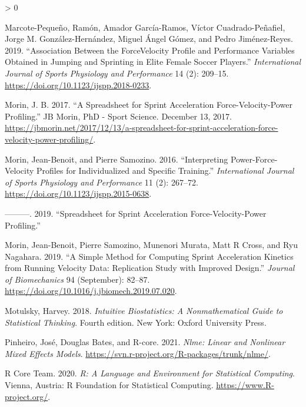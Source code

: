 \documentclass[fleqn,10pt]{wlpeerj} %
\newlength{\cslhangindent}
\newenvironment{CSLReferences}[2] %
 {%
  \setlength{\parindent}{0pt}
  \ifodd #1 \everypar{\setlength{\hangindent}{\cslhangindent}}\ignorespaces\fi
  \ifnum #2 > 0
  \setlength{\parskip}{#2\baselineskip}
  \fi
 }%
 {}
\begin{document}
\begin{CSLReferences}{1}{0}
\leavevmode\hypertarget{ref-marcote-pequenoAssociationForceVelocity2019}{}%
Marcote-Pequeño, Ramón, Amador García-Ramos, Víctor Cuadrado-Peñafiel, Jorge M. González-Hernández, Miguel Ángel Gómez, and Pedro Jiménez-Reyes. 2019. {``Association {Between} the {Force}{{Velocity Profile}} and {Performance Variables Obtained} in {Jumping} and {Sprinting} in {Elite Female Soccer Players}.''} \emph{International Journal of Sports Physiology and Performance} 14 (2): 209--15. \url{https://doi.org/10.1123/ijspp.2018-0233}.

\leavevmode\hypertarget{ref-morinSpreadsheetSprintAcceleration2017}{}%
Morin, J. B. 2017. {``A Spreadsheet for {Sprint} Acceleration {Force}-{Velocity}-{Power} Profiling.''} {JB Morin, PhD - Sport Science}. December 13, 2017. \url{https://jbmorin.net/2017/12/13/a-spreadsheet-for-sprint-acceleration-force-velocity-power-profiling/}.

\leavevmode\hypertarget{ref-morinInterpretingPowerForceVelocityProfiles2016}{}%
Morin, Jean-Benoit, and Pierre Samozino. 2016. {``Interpreting {Power}-{Force}-{Velocity Profiles} for {Individualized} and {Specific Training}.''} \emph{International Journal of Sports Physiology and Performance} 11 (2): 267--72. \url{https://doi.org/10.1123/ijspp.2015-0638}.

\leavevmode\hypertarget{ref-morinSpreadsheetSprintAcceleration2019}{}%
---------. 2019. {``Spreadsheet for {Sprint} Acceleration Force-Velocity-Power Profiling.''}

\leavevmode\hypertarget{ref-morinSimpleMethodComputing2019}{}%
Morin, Jean-Benoit, Pierre Samozino, Munenori Murata, Matt R Cross, and Ryu Nagahara. 2019. {``A Simple Method for Computing Sprint Acceleration Kinetics from Running Velocity Data: {Replication} Study with Improved Design.''} \emph{Journal of Biomechanics} 94 (September): 82--87. \url{https://doi.org/10.1016/j.jbiomech.2019.07.020}.

\leavevmode\hypertarget{ref-motulskyIntuitiveBiostatisticsNonmathematical2018}{}%
Motulsky, Harvey. 2018. \emph{Intuitive Biostatistics: A Nonmathematical Guide to Statistical Thinking}. Fourth edition. {New York}: {Oxford University Press}.

\leavevmode\hypertarget{ref-R-nlme}{}%
Pinheiro, José, Douglas Bates, and R-core. 2021. \emph{Nlme: Linear and Nonlinear Mixed Effects Models}. \url{https://svn.r-project.org/R-packages/trunk/nlme/}.

\leavevmode\hypertarget{ref-R-base}{}%
R Core Team. 2020. \emph{R: A Language and Environment for Statistical Computing}. Vienna, Austria: R Foundation for Statistical Computing. \url{https://www.R-project.org/}.


\end{CSLReferences}
\end{document}
